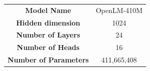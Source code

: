 \centering
    \resizebox{0.99\linewidth}{!}
    {
    \begin{tabular}{c|c}
    \toprule[1.5pt]
      {\bf Model Name} & OpenLM-410M\\
      {\bf Hidden dimension} & 1024\\
      {\bf Number of  Layers} & 24\\
      {\bf Number of  Heads} & 16\\
      {\bf Number of  Parameters} & 411,665,408\\
        \bottomrule[1pt]
    \end{tabular}
        }